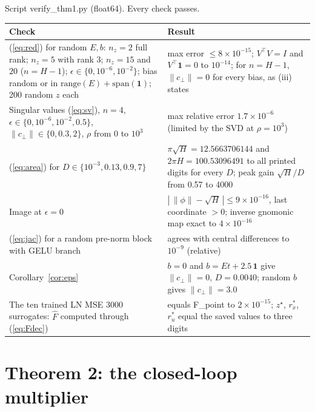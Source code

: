 \documentclass[11pt]{article}
\theoremstyle{plainnote}
\newcommand{\one}{\mathbf 1}
\newcommand{\cp}{c_\perp}
\begin{document}
Script verify\_thm1.py (float64). Every check passes.
\begin{center}
\small
\begin{tabular}{p{7.2cm}p{7.3cm}}
\toprule
Check & Result \\
\midrule
(\ref{eq:red}) for random $E,b$: $n_z=2$ full rank; $n_z=5$ with rank 3; $n_z=15$ and $20$ ($n=H-1$); $\epsilon\in\{0,10^{-6},10^{-2}\}$; bias random or in $\mathrm{range}(E)+\mathrm{span}(\one)$; 200 random $z$ each & max error $\le8\times10^{-15}$; $V^\top V=I$ and $V^\top\one=0$ to $10^{-14}$; for $n=H-1$, $\|\cp\|=0$ for every bias, as (iii) states \\
Singular values (\ref{eq:sv}), $n=4$, $\epsilon\in\{0,10^{-6},10^{-2},0.5\}$, $\|\cp\|\in\{0,0.3,2\}$, $\rho$ from $0$ to $10^3$ & max relative error $1.7\times10^{-6}$ (limited by the SVD at $\rho=10^3$) \\
(\ref{eq:area}) for $D\in\{10^{-3},0.13,0.9,7\}$ & $\pi\sqrt H=12.5663706144$ and $2\pi H=100.53096491$ to all printed digits for every $D$; peak gain $\sqrt H/D$ from 0.57 to 4000 \\
Image at $\epsilon=0$ & $|\,\|\phi\|-\sqrt H\,|\le9\times10^{-16}$, last coordinate $>0$; inverse gnomonic map exact to $4\times10^{-16}$ \\
(\ref{eq:jac}) for a random pre-norm block with GELU branch & agrees with central differences to $10^{-9}$ (relative) \\
Corollary~\ref{cor:eps} & $b=0$ and $b=Et+2.5\,\one$ give $\|\cp\|=0$, $D=0.0040$; random $b$ gives $\|\cp\|=3.0$ \\
The ten trained LN MSE 3000 surrogates: $\hat F$ computed through (\ref{eq:Fdec}) & equals F\_point to $2\times10^{-15}$; $z^\star$, $r^*_x$, $r^*_u$ equal the saved values to three digits \\
\bottomrule
\end{tabular}
\end{center}

\section{Theorem 2: the closed-loop multiplier}\label{sec:thm2}
\end{document}
